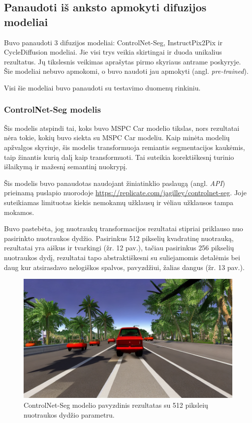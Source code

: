 \documentclass{VUMIFPSbakalaurinis}
\begin{document}
    
    \subsection{Panaudoti iš anksto apmokyti difuzijos modeliai}
        Buvo panaudoti 3 difuzijos modeliai: ControlNet-Seg, InstructPix2Pix ir CycleDiffusion modeliai. Jie visi trys veikia skirtingai ir duoda unikalius rezultatus. Jų tikslesnis veikimas aprašytas pirmo skyriaus antrame poskyryje. Šie modeliai nebuvo apmokomi, o buvo naudoti jau apmokyti (angl. \emph{pre-trained}).

        Visi šie modeliai buvo panaudoti su testavimo duomenų rinkiniu.

        \subsubsection{ControlNet-Seg modelis}
            Šis modelis atspindi tai, koks buvo MSPC Car modelio tikslas, nors rezultatai nėra tokie, kokių buvo siekta su MSPC Car modeliu. Kaip minėta modelių apžvalgos skyriuje, šis modelis transformuoja remiantis segmentacijos kaukėmis, taip žinantis kurią dalį kaip transformuoti. Tai suteikia korektiškesnį turinio išlaikymą ir mažesnį semantinį nuokrypį.

            Šis modelis buvo panaudotas naudojant žiniatinklio paslaugą (angl. \emph{API}) prieinamą puslapio nuorodoje \href{https://replicate.com/jagilley/controlnet-seg}{https://replicate.com/jagilley/controlnet-seg}. Joje suteikiamas limituotas kiekis nemokamų užklausų ir vėliau užklausos tampa mokamos.

            Buvo pastebėta, jog nuotraukų transformacijos rezultatai stipriai priklauso nuo pasirinkto nuotraukos dydžio. Pasirinkus 512 pikselių kvadratinę nuotrauką, rezultatai yra aiškus ir tvarkingi (žr. 12 pav.), tačiau pasirinkus 256 pikselių nuotraukos dydį, rezultatai tapo abstraktiškesni su suliejamomis detalėmis bei daug kur atsirasdavo nelogiškos spalvos, pavyzdžiui, žalias dangus (žr. 13 pav.). 

            \begin{figure}[H]
                \centering
                \includegraphics[scale=0.5]{img/diffusion/controlnet/512}
                \caption{ControlNet-Seg modelio pavyzdinis rezultatas su 512 piksleių nuotraukos dydžio parametru.}
                \label{img:mlp}
            \end{figure}
\end{document}
